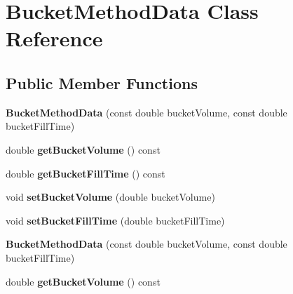 \hypertarget{class_bucket_method_data}{}\section{Bucket\+Method\+Data Class Reference}
\label{class_bucket_method_data}
\subsection*{Public Member Functions}
\begin{DoxyCompactItemize}
\item 
\mbox{\label{class_bucket_method_data_a5d0486b900e1e65db90d043a0bf5bd56}} 
{\bfseries Bucket\+Method\+Data} (const double bucket\+Volume, const double bucket\+Fill\+Time)
\item 
\mbox{\label{class_bucket_method_data_a423f76d6fc6766a62a931f3df1b7c213}} 
double {\bfseries get\+Bucket\+Volume} () const
\item 
\mbox{\label{class_bucket_method_data_a9617fcaa87b2baf4b39617acc4ad98a1}} 
double {\bfseries get\+Bucket\+Fill\+Time} () const
\item 
\mbox{\label{class_bucket_method_data_a8b3b85bb79a7f99ddc60da18cfe08454}} 
void {\bfseries set\+Bucket\+Volume} (double bucket\+Volume)
\item 
\mbox{\label{class_bucket_method_data_a9ef3dcb74da50b94e21b1b9dd3e712b0}} 
void {\bfseries set\+Bucket\+Fill\+Time} (double bucket\+Fill\+Time)
\item 
\mbox{\label{class_bucket_method_data_a5d0486b900e1e65db90d043a0bf5bd56}} 
{\bfseries Bucket\+Method\+Data} (const double bucket\+Volume, const double bucket\+Fill\+Time)
\item 
\mbox{\label{class_bucket_method_data_a423f76d6fc6766a62a931f3df1b7c213}} 
double {\bfseries get\+Bucket\+Volume} () const
\item 
\mbox{\label{class_bucket_method_data_a9617fcaa87b2baf4b39617acc4ad98a1}} 

\end{DoxyCompactItemize}
